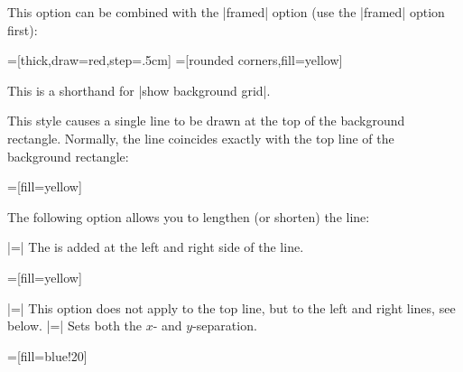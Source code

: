 \begin{itemize}
\begin{itemize}
\begin{codeexample}[]
\end{codeexample}
  This option can be combined with the |framed| option (use the
  |framed| option first):
\begin{codeexample}[]
=[thick,draw=red,step=.5cm]
=[rounded corners,fill=yellow]
\end{codeexample}
  This is a shorthand for |show background grid|.
  \end{itemize}
  This style causes a single line to be drawn at the top of the
  background rectangle. Normally, the line coincides exactly with the
  top line of the background rectangle:
\begin{codeexample}[]
=[fill=yellow]    
\end{codeexample}
  The following option allows you to lengthen (or shorten) the line:
  \begin{itemize}
    |=|
    The  is added at the left and right side of the
    line. 
\begin{codeexample}[]
=[fill=yellow]    
\end{codeexample}
    |=|
    This option does not apply to the top line, but to the left and
    right lines, see below.
    |=|
    Sets both the $x$- and $y$-separation.
\begin{codeexample}[]
=[fill=blue!20]    

\end{codeexample}
\end{itemize}
\end{itemize}
